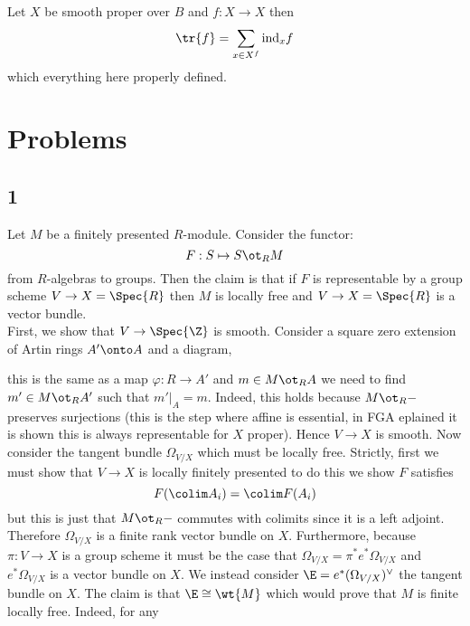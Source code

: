\documentclass{article}
\begin{document}
\newcommand{\ind}{\mathrm{ind}}

\begin{theorem}[Hoyois]
Let $X$ be smooth proper over $B$ and $f : X \to X$ then
\[ \tr{f} = \sum_{x \in X^f} \ind_x f \]
which everything here properly defined. 
\end{theorem}


\section{Problems}

\subsection{1}

Let $M$ be a finitely presented $R$-module. Consider the functor:
\[ F : S \mapsto S \ot_R M \]
from $R$-algebras to groups. Then the claim is that if $F$ is representable by a group scheme $V \to X = \Spec{R}$ then $M$ is locally free and $V \to X = \Spec{R}$ is a vector bundle.
\bigskip\\
First, we show that $V \to \Spec{\Z}$ is smooth. Consider a square zero extension of Artin rings $A' \onto A$ and a diagram,
\begin{center}
\end{center}
this is the same as a map $\varphi : R \to A'$ and $m \in M \ot_R A$ we need to find $m' \in M \ot_R A'$ such that $m'|_A = m$. Indeed, this holds because $M \ot_R -$ preserves surjections (this is the step where affine is essential, in FGA eplained it is shown this is always representable for $X$ proper). Hence $V \to X$ is smooth. Now consider the tangent bundle $\Omega_{V/X}$ which must be locally free. Strictly, first we must show that $V \to X$ is locally finitely presented to do this we show $F$ satisfies
\[ F(\colim A_i) = \colim F(A_i) \]
but this is just that $M \ot_R -$ commutes with colimits since it is a left adjoint. Therefore $\Omega_{V/X}$ is a finite rank vector bundle on $X$. Furthermore, because $\pi : V \to X$ is a group scheme it must be the case that $\Omega_{V/X} = \pi^* e^* \Omega_{V/X}$ and $e^* \Omega_{V/X}$ is a vector bundle on $X$. We instead consider $\E = e^* (\Omega_{V/X})^\vee$ the tangent bundle on $X$. The claim is that $\E \cong \wt{M}$ which would prove that $M$ is finite locally free. Indeed, for any 
\end{document}
